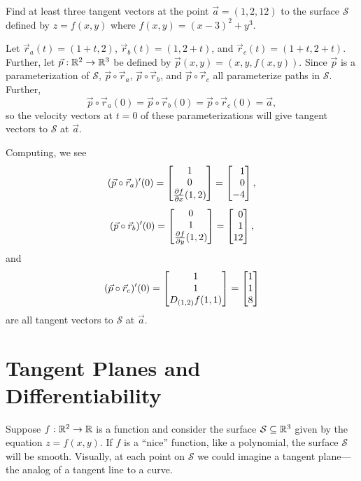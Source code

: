 \begin{example}
	Find at least three tangent vectors at the point $\vec a=(1,2,12)$
	to the surface $\mathcal S$ defined by $z=f(x,y)$ where $f(x,y)=(x-3)^2+y^3$.

	Let $\vec r_a(t) = (1+t,2)$, $\vec r_b(t)=(1,2+t)$, and $\vec r_c(t)=
	(1+t,2+t)$.  Further, let $\vec p:\mathbb{R}^2\to\mathbb{R}^3$ be defined by $\vec p(x,y)=
	(x,y,f(x,y))$.  Since $\vec p$ is a parameterization of $\mathcal S$,
	$\vec p\circ \vec r_a$, $\vec p\circ \vec r_b$, 
	and $\vec p\circ \vec r_c$ all parameterize paths in $\mathcal S$.  Further,
	\[\vec p\circ \vec r_a(0)=\vec p\circ \vec r_b(0)=\vec p\circ \vec r_c(0)=\vec a,\]
	so the velocity vectors at $t=0$ of these parameterizations will give 
	tangent vectors to $\mathcal S$ at $\vec a$.
	
	Computing, we see
	\[
	(\vec p\circ \vec r_a)'(0)
	= \matc{1\\0\\\frac{\partial f}{\partial x}(1,2)} = \mat{1\\0\\-4},
	\]
	\[
	(\vec p\circ \vec r_b)'(0)
	= \matc{0\\1\\\frac{\partial f}{\partial y}(1,2)} = \mat{0\\1\\12},
	\]
	and
	\[
	(\vec p\circ \vec r_c)'(0)
	= \matc{1\\1\\ D_{(1,2)}f(1,1)} = \mat{1\\1\\8}
	\]
	are all tangent vectors to $\mathcal S$ at $\vec a$.
\end{example}



\begin{exercises}
\end{exercises}

\section{Tangent Planes and Differentiability}

Suppose $f:\mathbb{R}^2\to\mathbb{R}$ is a function and consider the surface $\mathcal S\subseteq \mathbb{R}^3$
given by the equation $z=f(x,y)$.  If $f$ is a ``nice'' function, like a polynomial, 
the surface $\mathcal S$ will be smooth.  Visually, at each point on $\mathcal S$ we
could imagine a tangent plane---the analog of a tangent line to a curve.

